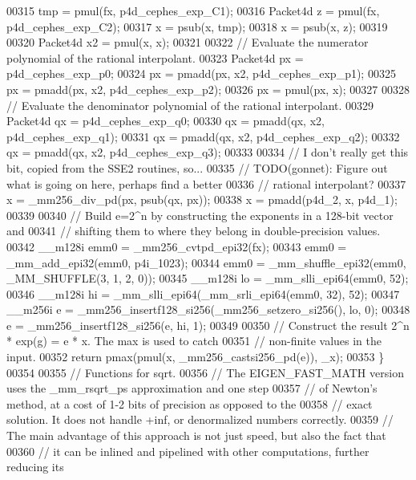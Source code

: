 \begin{DoxyCode}
00315   tmp = pmul(fx, p4d\_cephes\_exp\_C1);
00316   Packet4d z = pmul(fx, p4d\_cephes\_exp\_C2);
00317   x = psub(x, tmp);
00318   x = psub(x, z);
00319 
00320   Packet4d x2 = pmul(x, x);
00321 
00322   \textcolor{comment}{// Evaluate the numerator polynomial of the rational interpolant.}
00323   Packet4d px = p4d\_cephes\_exp\_p0;
00324   px = pmadd(px, x2, p4d\_cephes\_exp\_p1);
00325   px = pmadd(px, x2, p4d\_cephes\_exp\_p2);
00326   px = pmul(px, x);
00327 
00328   \textcolor{comment}{// Evaluate the denominator polynomial of the rational interpolant.}
00329   Packet4d qx = p4d\_cephes\_exp\_q0;
00330   qx = pmadd(qx, x2, p4d\_cephes\_exp\_q1);
00331   qx = pmadd(qx, x2, p4d\_cephes\_exp\_q2);
00332   qx = pmadd(qx, x2, p4d\_cephes\_exp\_q3);
00333 
00334   \textcolor{comment}{// I don't really get this bit, copied from the SSE2 routines, so...}
00335   \textcolor{comment}{// TODO(gonnet): Figure out what is going on here, perhaps find a better}
00336   \textcolor{comment}{// rational interpolant?}
00337   x = \_mm256\_div\_pd(px, psub(qx, px));
00338   x = pmadd(p4d\_2, x, p4d\_1);
00339 
00340   \textcolor{comment}{// Build e=2^n by constructing the exponents in a 128-bit vector and}
00341   \textcolor{comment}{// shifting them to where they belong in double-precision values.}
00342   \_\_m128i emm0 = \_mm256\_cvtpd\_epi32(fx);
00343   emm0 = \_mm\_add\_epi32(emm0, p4i\_1023);
00344   emm0 = \_mm\_shuffle\_epi32(emm0, \_MM\_SHUFFLE(3, 1, 2, 0));
00345   \_\_m128i lo = \_mm\_slli\_epi64(emm0, 52);
00346   \_\_m128i hi = \_mm\_slli\_epi64(\_mm\_srli\_epi64(emm0, 32), 52);
00347   \_\_m256i e = \_mm256\_insertf128\_si256(\_mm256\_setzero\_si256(), lo, 0);
00348   e = \_mm256\_insertf128\_si256(e, hi, 1);
00349 
00350   \textcolor{comment}{// Construct the result 2^n * exp(g) = e * x. The max is used to catch}
00351   \textcolor{comment}{// non-finite values in the input.}
00352   \textcolor{keywordflow}{return} pmax(pmul(x, \_mm256\_castsi256\_pd(e)), \_x);
00353 \}
00354 
00355 \textcolor{comment}{// Functions for sqrt.}
00356 \textcolor{comment}{// The EIGEN\_FAST\_MATH version uses the \_mm\_rsqrt\_ps approximation and one step}
00357 \textcolor{comment}{// of Newton's method, at a cost of 1-2 bits of precision as opposed to the}
00358 \textcolor{comment}{// exact solution. It does not handle +inf, or denormalized numbers correctly.}
00359 \textcolor{comment}{// The main advantage of this approach is not just speed, but also the fact that}
00360 \textcolor{comment}{// it can be inlined and pipelined with other computations, further reducing its}

\end{DoxyCode}
